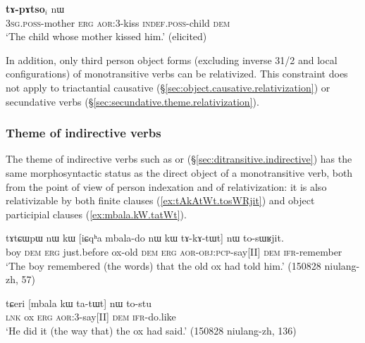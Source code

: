 \begin{exe}
\ex \label{ex:Wmu.kW.kanWpoR}
\gll [ɯ$_i$-mu kɯ ka-nɯpoʁ] \textbf{tɤ-pɤtso}$_i$ nɯ \\
\textsc{3sg}.\textsc{poss}-mother \textsc{erg} \textsc{aor}:3\flobv{}-kiss \textsc{indef}.\textsc{poss}-child \textsc{dem} \\
\glt `The child whose mother kissed him.' (elicited)
\end{exe}

In addition, only third person object forms (excluding inverse 3\fl{}1/2 and local configurations) of monotransitive verbs can be relativized. This constraint does not apply to triactantial causative (§\ref{sec:object.causative.relativization}) or secundative verbs (§\ref{sec:secundative.theme.relativization}).
\subsubsection{Theme of indirective verbs} \label{sec:indirective.relativization}
The theme of indirective verbs such as  or  (§\ref{sec:ditransitive.indirective}) has the same morphosyntactic status as the direct object of a monotransitive verb, both from the point of view of person indexation and of relativization: it is also relativizable by both finite clauses (\ref{ex:tAkAtWt.tosWRjit}) and object participial clauses (\ref{ex:mbala.kW.tatWt}).

\begin{exe}
\ex \label{ex:tAkAtWt.tosWRjit}
\gll tɤtɕɯpɯ nɯ kɯ [iɕqʰa mbala-do nɯ kɯ tɤ-kɤ-tɯt] nɯ to-sɯʁjit. \\
boy \textsc{dem} \textsc{erg} just.before ox-old \textsc{dem} \textsc{erg} \textsc{aor}-\textsc{obj}:\textsc{pcp}-say[II] \textsc{dem} \textsc{ifr}-remember \\
 \glt `The boy  remembered (the words) that the old ox had told him.' (150828 niulang-zh, 57)
 \end{exe}
 
 \begin{exe}
\ex \label{ex:mbala.kW.tatWt}
\gll tɕeri [mbala kɯ ta-tɯt] nɯ to-stu \\
\textsc{lnk} ox \textsc{erg} \textsc{aor}:3\flobv{}-say[II] \textsc{dem} \textsc{ifr}-do.like \\
\glt `He did it (the way that) the ox had said.' (150828 niulang-zh, 136)
\end{exe} 


